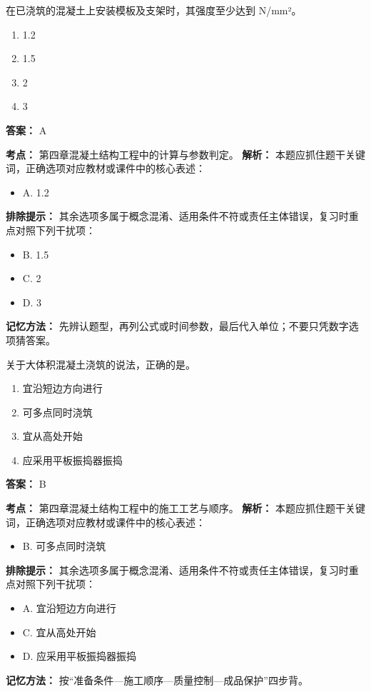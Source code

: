 \documentclass[UTF8,fontset=fandol,11pt]{ctexart}
\begin{document}
\vspace{0.2em}

\begin{quizbox}[title={第 80 题}]
在已浇筑的混凝土上安装模板及支架时，其强度至少达到 N/mm²。\\
\begin{enumerate}[label=\Alph*.]
\item 1.2
\item 1.5
\item 2
\item 3
\end{enumerate}
\textbf{答案：} A
\vspace{0.25em}
\begin{answerbox}[title={考点解析}]
\textbf{考点：} 第四章混凝土结构工程中的计算与参数判定。
\textbf{解析：} 本题应抓住题干关键词，正确选项对应教材或课件中的核心表述：
\begin{itemize}
\item A. 1.2
\end{itemize}
\textbf{排除提示：} 其余选项多属于概念混淆、适用条件不符或责任主体错误，复习时重点对照下列干扰项：
\begin{itemize}
\item B. 1.5
\item C. 2
\item D. 3
\end{itemize}
\textbf{记忆方法：} 先辨认题型，再列公式或时间参数，最后代入单位；不要只凭数字选项猜答案。
\end{answerbox}
\end{quizbox}

\vspace{0.2em}

\begin{quizbox}[title={第 81 题}]
关于大体积混凝土浇筑的说法，正确的是。\\
\begin{enumerate}[label=\Alph*.]
\item 宜沿短边方向进行
\item 可多点同时浇筑
\item 宜从高处开始
\item 应采用平板振捣器振捣
\end{enumerate}
\textbf{答案：} B
\vspace{0.25em}
\begin{answerbox}[title={考点解析}]
\textbf{考点：} 第四章混凝土结构工程中的施工工艺与顺序。
\textbf{解析：} 本题应抓住题干关键词，正确选项对应教材或课件中的核心表述：
\begin{itemize}
\item B. 可多点同时浇筑
\end{itemize}
\textbf{排除提示：} 其余选项多属于概念混淆、适用条件不符或责任主体错误，复习时重点对照下列干扰项：
\begin{itemize}
\item A. 宜沿短边方向进行
\item C. 宜从高处开始
\item D. 应采用平板振捣器振捣
\end{itemize}
\textbf{记忆方法：} 按“准备条件—施工顺序—质量控制—成品保护”四步背。
\end{answerbox}
\end{quizbox}
\end{document}
